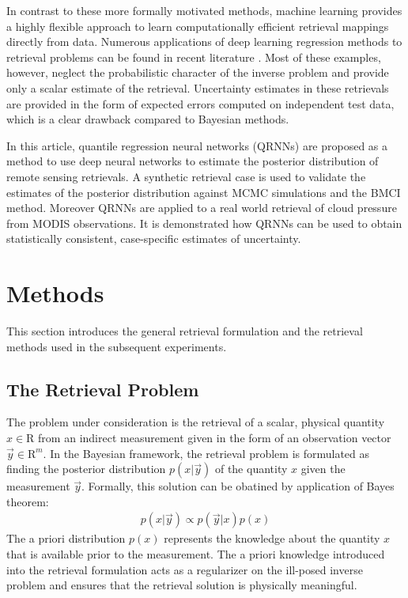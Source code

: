 \documentclass[journal abbreviation, manuscript]{copernicus}
\begin{document}
In contrast to these more formally motivated methods, machine learning provides a
highly flexible approach to learn computationally efficient retrieval mappings
directly from data. Numerous applications of deep learning regression methods
to retrieval problems can be found in recent literature \citep{holl, strandgren, hakansson}.
Most of these examples, however, neglect the probabilistic character of the inverse problem
and provide only a scalar estimate of the retrieval. Uncertainty estimates in these
retrievals are provided in the form of expected errors computed on independent test data,
which is a clear drawback compared to Bayesian methods.

In this article, quantile regression neural networks (QRNNs) are proposed as a method to use
deep neural networks to estimate the posterior distribution of remote sensing
retrievals. A synthetic retrieval case is used to validate the estimates of the
posterior distribution against MCMC simulations and the BMCI method. Moreover
QRNNs are applied to a real world retrieval of cloud pressure from MODIS
observations. It is demonstrated how QRNNs can be used to obtain statistically
consistent, case-specific estimates of uncertainty.


\section{Methods}

This section introduces the general retrieval formulation and the retrieval methods
used in the subsequent experiments.

\subsection{The Retrieval Problem}

The problem under consideration is the retrieval of a scalar, physical quantity
$x \in \mathrm{R}$ from an indirect measurement given in the form of an observation
vector $\vec{y} \in \mathrm{R}^m$. In the Bayesian framework, the retrieval problem is
formulated as finding the posterior distribution $p(x | \vec{y})$ of the
quantity $x$ given the measurement $\vec{y}$. Formally, this solution can be
obatined by application of Bayes theorem:
\begin{align}
  p(x | \vec{y}) \propto p(\vec{y} | x)p(x)
\end{align}
The a priori distribution $p(x)$ represents the knowledge about the quantity $x$ that
is available prior to the measurement. The a priori knowledge introduced into the
retrieval formulation acts as a regularizer on the ill-posed inverse problem and
ensures that the retrieval solution is physically meaningful.
\end{document}
